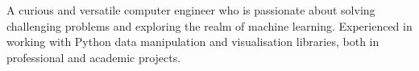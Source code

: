 A curious and versatile computer engineer who is passionate about solving challenging problems and exploring the realm of machine learning.
Experienced in working with Python data manipulation and visualisation libraries, both in professional and academic projects.

\vspace{0.2cm}